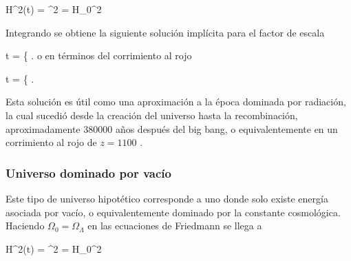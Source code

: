 { H^2(t) = ^2 = H_0^2  }


Integrando se obtiene la siguiente solución implícita para el factor de 
escala


{ t = \left\{   \right. }
o en términos del corrimiento al rojo


{ t = \left\{   \right. }


Esta solución es útil como una aproximación a la época dominada por 
radiación, la cual sucedió desde la creación del universo hasta la 
recombinación, aproximadamente $380 000$ años después del big bang, o 
equivalentemente en un corrimiento al rojo de $z = 1100$ 
\cite{padmanabhan1995}.


			\subsubsection*{Universo dominado por vacío}
			
Este tipo de universo hipotético corresponde a uno donde solo existe 
energía asociada por vacío, o equivalentemente dominado por la constante 
cosmológica. Haciendo $\Omega_0 = \Omega_\Lambda$ en las ecuaciones de 
Friedmann se llega a 


{ H^2(t) = ^2 = H_0^2  }



